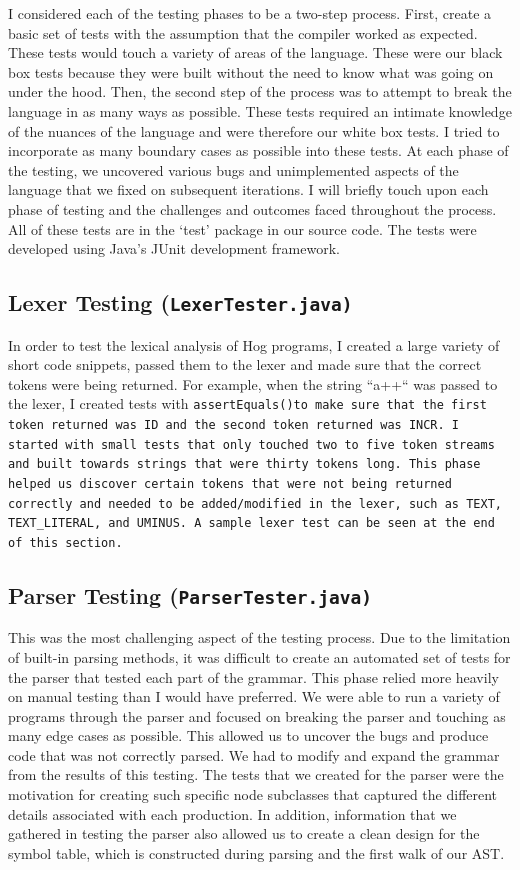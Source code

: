 \documentclass{book}
\begin{document}
I considered each of the testing phases to be a two-step process. First, create a basic set of tests with the assumption that the compiler worked as expected. These tests would touch a variety of areas of the language. These were our black box tests because they were built without the need to know what was going on under the hood. Then, the second step of the process was to attempt to break the language in as many ways as possible. These tests required an intimate knowledge of the nuances of the language and were therefore our white box tests. I tried to incorporate as many boundary cases as possible into these tests. At each phase of the testing, we uncovered various bugs and unimplemented aspects of the language that we fixed on subsequent iterations. I will briefly touch upon each phase of testing and the challenges and outcomes faced throughout the process. All of these tests are in the ‘test’ package in our source code. The tests were developed using Java’s JUnit development framework.

\subsection*{Lexer Testing (\tt LexerTester.java\rm)}
 
In order to test the lexical analysis of Hog programs, I created a large variety of short code snippets, passed them to the lexer and made sure that the correct tokens were being returned. For example, when the string ``a++`` was passed to the lexer, I created tests with \tt assertEquals()\rm to make sure that the first token returned was ID and the second token returned was INCR. I started with small tests that only touched two to five token streams and built towards strings that were thirty tokens long. This phase helped us discover certain tokens that were not being returned correctly and needed to be added/modified in the lexer, such as \tt TEXT\rm, \tt TEXT\_LITERAL\rm, and \tt UMINUS\rm. A sample lexer test can be seen at the end of this section.

\subsection*{Parser Testing (\tt ParserTester.java\rm)}

This was the most challenging aspect of the testing process. Due to the limitation of built-in parsing methods, it was difficult to create an automated set of tests for the parser that tested each part of the grammar. This phase relied more heavily on manual testing than I would have preferred. We were able to run a variety of programs through the parser and focused on breaking the parser and touching as many edge cases as possible. This allowed us to uncover the bugs and produce code that was not correctly parsed. We had to modify and expand the grammar from the results of this testing. The tests that we created for the parser were the motivation for creating such specific node subclasses that captured the different details associated with each production. In addition, information that we gathered in testing the parser also allowed us to create a clean design for the symbol table, which is constructed during parsing and the first walk of our AST.
\end{document}
